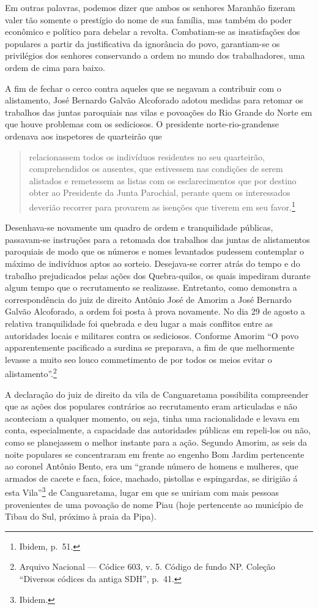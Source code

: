 \begin{refsection}
Em outras palavras, podemos dizer que ambos os senhores Maranhão fizeram valer tão somente o prestígio do nome de sua família, mas também do poder econômico e político para debelar a revolta. Combatiam-se as insatisfações dos populares a partir da justificativa da ignorância do povo, garantiam-se os privilégios dos senhores conservando a ordem no mundo dos trabalhadores, uma ordem de cima para baixo. 

A fim de fechar o cerco contra aqueles que se negavam a contribuir com o alistamento, José Bernardo Galvão Alcoforado adotou medidas para retomar os trabalhos das juntas paroquiais nas vilas e povoações do Rio Grande do Norte em que houve problemas com os sediciosos. O presidente norte-rio-grandense ordenava aos inspetores de quarteirão que  

\begin{quote}
    relacionassem todos os indivíduos residentes no seu quarteirão, comprehendidos os ausentes, que estivessem nas condições de serem alistados e remetessem  as listas com os esclarecimentos que por destino obter ao Presidente da Junta Parochial, perante quem os interessados deverião recorrer para provarem as isenções que tiverem em seu favor.\footnote{Ibidem, p.~51.}
\end{quote}

Desenhava-se novamente um quadro de ordem e tranquilidade públicas, passavam-se instruções para a retomada dos trabalhos das juntas de alistamentos paroquiais de modo que os números e nomes levantados pudessem contemplar o máximo de indivíduos aptos ao sorteio. Desejava-se correr atrás do tempo e do trabalho prejudicados pelas ações dos Quebra-quilos, os quais impediram durante algum tempo que o recrutamento se realizasse. Entretanto, como demonstra a correspondência do juiz de direito Antônio José de Amorim a José Bernardo Galvão Alcoforado, a ordem foi posta à prova novamente. No dia 29 de agosto a relativa tranquilidade foi quebrada e deu lugar a mais conflitos entre as autoridades locais e militares contra os sediciosos. Conforme Amorim “O povo apparentemente pacificado a surdina se preparava, a fim de que melhormente levasse a muito seo louco commetimento de por todos os meios evitar o alistamento”.\footnote{Arquivo Nacional --- Códice 603, v. 5. Código de fundo NP. Coleção “Diversos códices da antiga SDH”, p.~41.} 

A declaração do juiz de direito da vila de Canguaretama possibilita compreender que as ações dos populares contrários ao recrutamento eram articuladas e não aconteciam a qualquer momento, ou seja, tinha uma racionalidade e levava em conta, especialmente, a capacidade das autoridades públicas em repeli-los ou não, como se planejassem o melhor instante para a ação. Segundo Amorim, as seis da noite populares se concentraram em frente ao engenho Bom Jardim pertencente ao coronel Antônio Bento, era um “grande número de homens e mulheres, que armados de cacete e faca, foice, machado, pistollas e espingardas, se dirigião á esta Vila”\footnote{Ibidem.} de Canguaretama, lugar em que se uniriam com mais pessoas provenientes de uma povoação de nome Piau (hoje pertencente ao município de Tibau do Sul, próximo à praia da Pipa).


\end{refsection}

